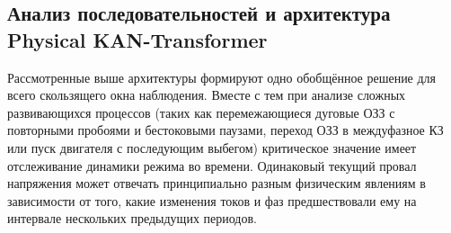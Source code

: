 {}

{}





















\subsection{Анализ последовательностей и архитектура Physical KAN-Transformer}
\label{sec:ch4_attention_architecture}

Рассмотренные выше архитектуры формируют одно обобщённое решение для всего
скользящего окна наблюдения. Вместе с тем при анализе сложных развивающихся
процессов (таких как перемежающиеся дуговые ОЗЗ с повторными пробоями и
бестоковыми паузами, переход ОЗЗ в междуфазное КЗ или пуск двигателя с
последующим выбегом) критическое значение имеет отслеживание динамики
режима во времени. Одинаковый текущий провал напряжения может отвечать
принципиально разным физическим явлениям в зависимости от того, какие
изменения токов и фаз предшествовали ему на интервале нескольких
предыдущих периодов.

